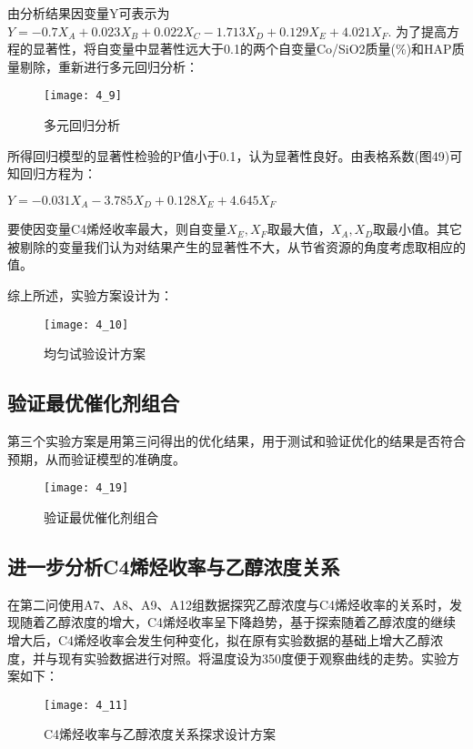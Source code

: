 \documentclass[withoutpreface,bwprint]{cumcmthesis} %
\begin{document}
由分析结果因变量Y可表示为$Y=-0.7X_A+0.023X_B+0.022X_C-1.713X_D+0.129X_E+4.021X_F$.
为了提高方程的显著性，将自变量中显著性远大于0.1的两个自变量Co/SiO2质量(\%)和HAP质量剔除，重新进行多元回归分析：
\begin{figure}[!h]
	\centering
	\texttt{[image: 4\_9]}
	\caption{多元回归分析}
	\label{fig:circuit-diagram1}
\end{figure}



所得回归模型的显著性检验的P值小于0.1，认为显著性良好。由表格系数(图49)可知回归方程为：

$Y=-0.031X_A-3.785X_D+0.128X_E+4.645X_F$

要使因变量C4烯烃收率最大，则自变量$X_E,X_F$取最大值，$X_A,X_D$取最小值。其它被剔除的变量我们认为对结果产生的显著性不大，从节省资源的角度考虑取相应的值。

综上所述，实验方案设计为：
\begin{figure}[!h]
	\centering
	\texttt{[image: 4\_10]}
	\caption{均匀试验设计方案}
	\label{fig:circuit-diagram1}
\end{figure}


\subsection{验证最优催化剂组合}
第三个实验方案是用第三问得出的优化结果，用于测试和验证优化的结果是否符合预期，从而验证模型的准确度。
\begin{figure}[!h]
	\centering
	\texttt{[image: 4\_19]}
	\caption{验证最优催化剂组合}
	\label{fig:circuit-diagram1}
\end{figure}




\subsection{进一步分析C4烯烃收率与乙醇浓度关系}
在第二问使用A7、A8、A9、A12组数据探究乙醇浓度与C4烯烃收率的关系时，发现随着乙醇浓度的增大，C4烯烃收率呈下降趋势，基于探索随着乙醇浓度的继续增大后，C4烯烃收率会发生何种变化，拟在原有实验数据的基础上增大乙醇浓度，并与现有实验数据进行对照。将温度设为350度便于观察曲线的走势。实验方案如下：
\begin{figure}[!h]
	\centering
	\texttt{[image: 4\_11]}
	\caption{C4烯烃收率与乙醇浓度关系探求设计方案}
	\label{fig:circuit-diagram1}
\end{figure}
\end{document}
